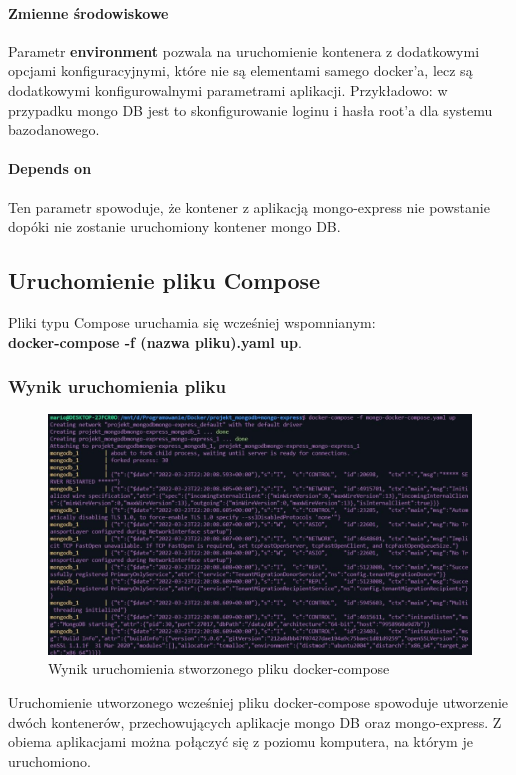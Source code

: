 \documentclass[12pt, a4paper]{article}
\begin{document}
        \paragraph{Zmienne środowiskowe} Parametr \textbf{environment} pozwala na uruchomienie kontenera z dodatkowymi opcjami konfiguracyjnymi, które nie są elementami samego docker'a, lecz są dodatkowymi konfigurowalnymi parametrami aplikacji. Przykładowo: w przypadku mongo DB jest to skonfigurowanie loginu i hasła root'a dla systemu bazodanowego.
        \paragraph{Depends on} Ten parametr spowoduje, że kontener z aplikacją mongo-express nie powstanie dopóki nie zostanie uruchomiony kontener mongo DB.
    \subsection{Uruchomienie pliku Compose}
        Pliki typu Compose uruchamia się wcześniej wspomnianym: 
        \\
        \textbf{docker-compose -f (nazwa pliku).yaml up}. 
        \subsubsection{Wynik uruchomienia pliku}
            \begin{figure}[!h]
                \centering
                \includegraphics[width=\textwidth]{docker-compose-f.JPG}
                \caption{Wynik uruchomienia stworzonego pliku docker-compose}
                \label{fig:docker_compose_f}
            \end{figure}
            Uruchomienie utworzonego wcześniej pliku docker-compose spowoduje utworzenie dwóch kontenerów, przechowujących aplikacje mongo DB oraz mongo-express. Z obiema aplikacjami można połączyć się z poziomu komputera, na którym je uruchomiono.
\end{document}
